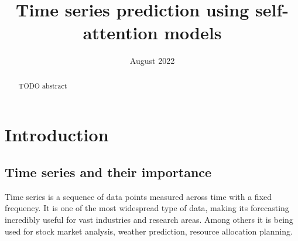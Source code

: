 \documentclass[en]{pracamgr}
\title{Time series prediction using self-attention models}
\date{August 2022}
\begin{document}
\maketitle

\begin{abstract}
  TODO abstract
\end{abstract}

\tableofcontents

\chapter{Introduction}
\section{Time series and their importance}\label{r:tsi}


Time series is a sequence of data points measured across time with a fixed frequency.
It is one of the most widespread type of data, making its forecasting incredibly useful for vast industries and research areas. Among others it is being used for stock market analysis, weather prediction, resource allocation planning.

\end{document}
